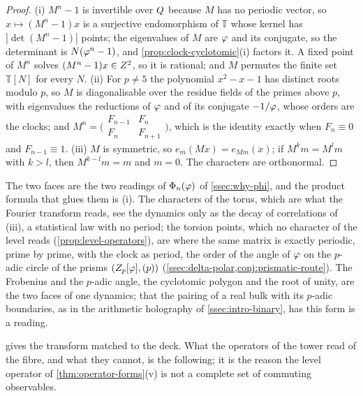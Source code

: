 \begin{proof}
(i) $M^n-1$ is invertible over $Q$ because $M$ has no periodic vector, so $x\mapsto(M^n-1)x$ is a surjective
endomorphism of $\mathbb T$ whose kernel has $|\det(M^n-1)|$ points; the eigenvalues of $M$ are $\varphi$ and its
conjugate, so the determinant is $N(\varphi^n-1)$, and \cref{prop:clock-cyclotomic}(i) factors it.  A fixed point of
$M^n$ solves $(M^n-1)x\in Z^2$, so it is rational; and $M$ permutes the finite set $\mathbb T[N]$ for every $N$.
(ii) For $p\neq5$ the polynomial $x^2-x-1$ has distinct roots modulo $p$, so $M$ is diagonalisable over the residue
fields of the primes above $p$, with eigenvalues the reductions of $\varphi$ and of its conjugate $-1/\varphi$,
whose orders are the clocks; and $M^n=\bigl(\begin{smallmatrix}F_{n-1}&F_n\\F_n&F_{n+1}\end{smallmatrix}\bigr)$, which is the identity
exactly when $F_n\equiv0$ and $F_{n-1}\equiv1$.
(iii) $M$ is symmetric, so $e_m(Mx)=e_{Mm}(x)$; if $M^km=M^lm$ with $k>l$, then $M^{k-l}m=m$ and $m=0$.  The
characters are orthonormal.
\end{proof}

The two faces are the two readings of $\Phi_n(\varphi)$ of \cref{ssec:why-phi}, and the product formula that glues
them is (i).  The characters of the torus, which are what the Fourier transform reads, see the dynamics only as the
decay of correlations of (iii), a statistical law with no period; the torsion points, which no character of the
level reads (\cref{prop:level-operators}), are where the same matrix is exactly periodic, prime by prime, with the
clock as period, the order of the angle of $\varphi$ on the $p$-adic circle of the prisms $(Z_p[\varphi],(p))$
(\cref{ssec:delta-polar,conj:prismatic-route}).
The Frobenius and the $p$-adic angle, the cyclotomic polygon and the root of unity, are the two faces of one
dynamics; that the pairing of a real bulk with its $p$-adic boundaries, as in the arithmetic holography of
\cref{ssec:intro-binary}, has this form is a reading.

 gives the transform matched to the deck.  What the operators of the tower read of the
fibre, and what they cannot, is the following; it is the reason the level operator of \cref{thm:operator-forms}(v)
is not a complete set of commuting observables.

